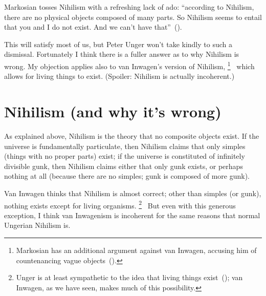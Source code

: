 \documentclass[11pt]{article}
\begin{document}
\begin{spacing}{1.5}
Markosian tosses Nihilism with a refreshing lack of ado: ``according to Nihilism, there are no physical objects composed of many parts. So Nihilism seems to entail that you and I do not exist. And we can't have that''~(\citeyear[220]{markosian1998a}).

This will satisfy most of us, but Peter Unger won't take kindly to such a dismissal. Fortunately I think there is a fuller answer as to why Nihilism is wrong. My objection applies also to van Inwagen's version of Nihilism,%
%
\footnote{Markosian has an additional argument against van Inwagen, accusing him of countenancing vague objects~(\citeyear[222--223]{markosian1998a}).}%
%
\ which allows for living things to exist. (Spoiler: Nihilism is actually incoherent.)

\section{Nihilism (and why it's wrong)}
\label{nihilism}
As explained above, Nihilism is the theory that no composite objects exist. If the universe is fundamentally particulate, then Nihilism claims that only simples (things with no proper parts) exist; if the universe is constituted of infinitely divisible gunk, then Nihilism claims either that only gunk exists, or perhaps nothing at all (because there are no simples; gunk is composed of more gunk).

Van Inwagen thinks that Nihilism is almost correct; other than simples (or gunk), nothing exists except for living organisms.%
%
\footnote{Unger is at least sympathetic to the idea that living things exist~(\citeyear[151]{unger1979}); van Inwagen, as we have seen, makes much of this possibility.}%
%
\ But even with this generous exception, I think van Inwagenism is incoherent for the same reasons that normal Ungerian Nihilism is.


\end{spacing}
\end{document}
